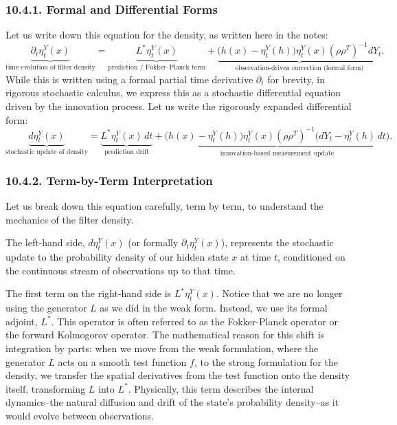 \documentclass[11pt]{article}
\theoremstyle{definition}
\theoremstyle{remark}
\begin{document}
\subsubsection*{10.4.1. Formal and Differential Forms}
Let us write down this equation for the density, as written here in the notes:
\[
\underbrace{\partial_t\eta_t^Y(x)}_{\text{time evolution of filter density}}
=
\underbrace{L^\ast\eta_t^Y(x)}_{\text{prediction / Fokker--Planck term}}
+
\underbrace{\bigl(h(x)-\eta_t^Y(h)\bigr)\eta_t^Y(x)(\rho\rho^T)^{-1}dY_t}_{\text{observation-driven correction (formal form)}}.
\]
While this is written using a formal partial time derivative $\partial_t$ for brevity, in rigorous stochastic calculus, we express this as a stochastic differential equation driven by the innovation process. Let us write the rigorously expanded differential form:
\[
\underbrace{d\eta_t^Y(x)}_{\text{stochastic update of density}}
=
\underbrace{L^\ast\eta_t^Y(x)\,dt}_{\text{prediction drift}}
+
\underbrace{\bigl(h(x)-\eta_t^Y(h)\bigr)\eta_t^Y(x)(\rho\rho^T)^{-1}\bigl(dY_t-\eta_t^Y(h)\,dt\bigr)}_{\text{innovation-based measurement update}}.
\]

\subsubsection*{10.4.2. Term-by-Term Interpretation}
Let us break down this equation carefully, term by term, to understand the mechanics of the filter density.

The left-hand side, $d\eta_t^Y(x)$ (or formally $\partial_t\eta_t^Y(x)$), represents the stochastic update to the probability density of our hidden state $x$ at time $t$, conditioned on the continuous stream of observations up to that time.

The first term on the right-hand side is $L^\ast\eta_t^Y(x)$. Notice that we are no longer using the generator $L$ as we did in the weak form. Instead, we use its formal adjoint, $L^\ast$. This operator is often referred to as the Fokker-Planck operator or the forward Kolmogorov operator. The mathematical reason for this shift is integration by parts: when we move from the weak formulation, where the generator $L$ acts on a smooth test function $f$, to the strong formulation for the density, we transfer the spatial derivatives from the test function onto the density itself, transforming $L$ into $L^\ast$. Physically, this term describes the internal dynamics--the natural diffusion and drift of the state's probability density--as it would evolve between observations.
\end{document}
